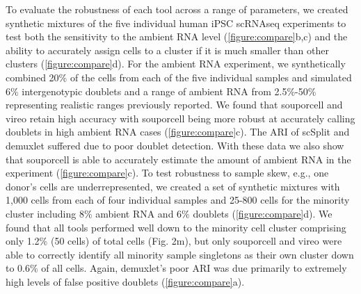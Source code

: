 \par{
To evaluate the robustness of each tool across a range of parameters, we created synthetic mixtures of the five individual human iPSC scRNAseq experiments to test both the sensitivity to the ambient RNA level (\ref{figure:compare}b,c) and the ability to accurately assign cells to a cluster if it is much smaller than other clusters (\ref{figure:compare}d). For the ambient RNA experiment, we synthetically combined 20\% of the cells from each of the five individual samples and simulated 6\% intergenotypic doublets and a range of ambient RNA from 2.5\%-50\% representing realistic ranges previously reported\cite{soupx}. We found that souporcell and vireo retain high accuracy with souporcell being more robust at accurately calling doublets in high ambient RNA cases (\ref{figure:compare}c). The ARI of scSplit and demuxlet suffered due to poor doublet detection. With these data we also show that souporcell is able to accurately estimate the amount of ambient RNA in the experiment (\ref{figure:compare}c). To test robustness to sample skew, e.g., one donor's cells are underrepresented, we created a set of synthetic mixtures with 1,000 cells from each of four individual samples and 25-800 cells for the minority cluster including 8\% ambient RNA and 6\% doublets (\ref{figure:compare}d). We found that all tools performed well down to the minority cell cluster comprising only 1.2\% (50 cells) of total cells (Fig. 2m), but only souporcell and vireo were able to correctly identify all minority sample singletons as their own cluster down to 0.6\% of all cells. Again, demuxlet's poor ARI was due primarily to extremely high levels of false positive doublets (\ref{figure:compare}a).
}


